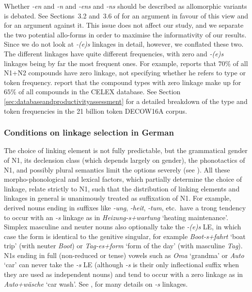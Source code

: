 Whether \textit{-en} and \textit{-n} and \textit{-ens} and \textit{-ns} should be described as allomorphic variants is debated.
See Sections~3.2 and~3.6 of \textcite{NueblingSzczepaniak2013} for an argument in favour of this view and \textcite[33--36]{Neef2015} for an argument against it.
This issue does not affect our study, and we separate the two potential allo-forms in order to maximise the informativity of our results.
Since we do not look at \textit{-(e)s} linkages in detail, however, we conflated these two.
The different linkages have quite different frequencies, with zero and \textit{-(e)s} linkages being by far the most frequent ones.
For example, \textcite[177]{Gallmann1998} reports that $70\%$ of all N1+N2 compounds have zero linkage, not specifying whether he refers to type or token frequency.
\textcite[29]{KrottEa2007} report that the compound types with zero linkage make up for $65\%$ of all compounds in the CELEX database.
See Section~ \ref{sec:databaseandproductivityassessment} for a detailed breakdown of the type and token frequencies in the 21 billion token DECOW16A corpus.

\subsubsection{Conditions on linkage selection in German}

The choice of linking element is not fully predictable, but the grammatical gender of N1, its declension class (which depends largely on gender), the phonotactics of N1, and possibly plural semantics limit the options severely (see \citealt{Fuhrhop1996,NueblingSzczepaniak2013}).
All these morpho-phono\-logical and lexical factors, which partially determine the choice of linkage, relate strictly to N1, such that the distribution of linking elements and linkages in general is unanimously treated as suffixation of N1.
For example, derived nouns ending in suffixes like \textit{-ung}, \textit{-heit}, \textit{-tum}, etc.\ have a trong tendency to occur with an \textit{-s} linkage as in \textit{Heizung-s+wartung} `heating maintenance'.
Simplex masculine and neuter nouns also optionally take the \textit{-(e)s} LE, in which case the form is identical to the genitive singular, for example \textit{Boot-s+fahrt} `boat trip' (with neuter \textit{Boot}) or \textit{Tag-es+form} `form of the day' (with masculine \textit{Tag}).
N1s ending in full (non-reduced or tense) vowels such as \textit{Oma} `grandma' or \textit{Auto} `car' can never take the \textit{-s} LE (although \textit{-s} is their only inflectional suffix when they are used as independent nouns) and tend to occur with a zero linkage as in \textit{Auto+wäsche} `car wash'.
See \textcite{Wegener2003}, \textcite{FuhrhopKuerschner2015} for many details on \textit{-s} linkages.

